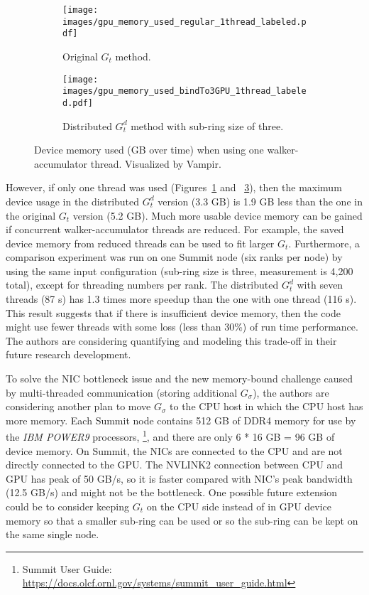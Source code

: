 \begin{figure}[h]
\centering
     \begin{subfigure}[b]{\columnwidth}
         \centering
         \texttt{[image: images/gpu\_memory\_used\_regular\_1thread\_labeled.pdf]}
         \caption{Original $G_t$ method.}
         \label{fig:original_1thread}
     \end{subfigure}
     
    \begin{subfigure}[b]{\columnwidth}
         \centering
         \texttt{[image: images/gpu\_memory\_used\_bindTo3GPU\_1thread\_labeled.pdf]}
         \caption{Distributed $G^d_t$ method with sub-ring size of three.}
         \label{fig:distributed_1thread}
     \end{subfigure}
     
\caption{Device memory used (GB over time) when using one walker-accumulator thread. Visualized by Vampir.}
\end{figure}


However, if only one thread was used (Figures~\ref{fig:original_1thread} and ~\ref{fig:distributed_1thread}), then 
the maximum device usage in the distributed $G^d_t$ version (3.3 GB)
is 1.9 GB less than the one in the original $G_t$ version (5.2 GB). Much more usable
device memory can be gained if concurrent walker-accumulator threads are reduced. For example, the saved
device memory from reduced threads can be used to fit larger $G_t$. Furthermore, a comparison experiment was run on one Summit node (six ranks per node) by using the same input configuration 
(sub-ring size is three, measurement is 4,200 total), except for threading numbers per rank. 
The distributed $G^d_t$ with seven threads (87 s) has 1.3 times more speedup 
than the one with one thread (116 s). This result suggests that if there is insufficient 
device memory, then the code might use fewer threads with some loss (less than 30\%) of run time 
performance. The authors are considering quantifying and modeling this trade-off in their future research development.

To solve the NIC bottleneck issue and the new memory-bound challenge
caused by multi-threaded communication (storing additional
$G_{\sigma}$), the authors are considering another plan to move $G_{\sigma}$
to the CPU host in which the CPU host has more memory.
%
Each Summit node contains 512 GB of DDR4 memory for use by the \textit{IBM POWER9} 
processors, \footnote{Summit User Guide: \url{https://docs.olcf.ornl.gov/systems/summit_user_guide.html} }, 
and there are only 6  * 16 GB = 96 GB of device memory.
%
On Summit, the NICs are connected to the CPU and are not directly connected to the GPU.
%
The NVLINK2 connection between CPU and GPU has peak of 50 GB/s, so
it is faster compared with NIC's peak bandwidth (12.5 GB/s) and might not be the bottleneck.
%
One possible future extension could be to consider keeping $G_t$ on the
CPU side instead of in GPU device memory so that a
smaller sub-ring can be used or so the sub-ring can be kept on the same single node.
%

